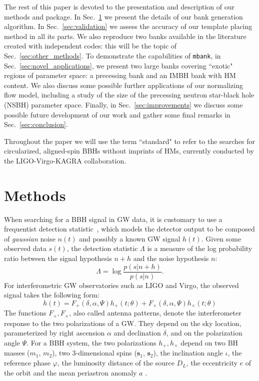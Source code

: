 \documentclass[twocolumn,showpacs,preprintnumbers,nofootinbib,prd,
superscriptaddress,10pt]{revtex4-2}
\begin{document}
The rest of this paper is devoted to the presentation and description of our methods and package.
In Sec.~\ref{sec:methods} we present the details of our bank generation algorithm.
In Sec.~\ref{sec:validation} we assess the accuracy of our template placing method in all its parts.
We also reproduce two banks available in the literature \cite{Harry:2017weg, Sakon:2022ibh} created with independent codes: this will be the topic of Sec.~\ref{sec:other_methods}.
To demonstrate the capabilities of \texttt{mbank}, in Sec.~\ref{sec:novel_applications}, we present two large banks covering ``exotic" regions of parameter space: a precessing bank and an IMBH bank with HM content. We also discuss some possible further applications of our normalizing flow model, including a study of the size of the precessing neutron star-black hole (NSBH) parameter space.
Finally, in Sec.~\ref{sec:improvements} we discuss some possible future development of our work and gather some final remarks in Sec.~\ref{sec:conclusion}.

Throughout the paper we will use the term ``standard" to refer to the searches for circularized, aligned-spin BBHs without imprints of HMs, currently conducted by the LIGO-Virgo-KAGRA collaboration.

\section{Methods} \label{sec:methods}

When searching for a BBH signal in GW data, it is customary to use a frequentist detection statistic~\cite{Creighton_book, Maggiore:2007ulw, Harry:2016ijz, Harry:2017weg}, which models the detector output to be composed of {\it gaussian} noise $n(t)$ and possibly a known GW signal $h(t)$.
Given some observed data $s(t)$, the detection statistic $\Lambda$ is a measure of the log probability ratio between the signal hypothesis $n+h$ and the noise hypothesis $n$:
\begin{equation}\label{eq:LL}
	\Lambda = \log\frac{p(s|n+h)}{p(s| n)}.
\end{equation}
For interferometric GW observatories such as LIGO and Virgo, the observed signal takes the following form:
\begin{equation}\label{eq:signal_model}
	h(t) = F_+(\delta, \alpha, \Psi) h_+(t;\theta) + F_\times(\delta, \alpha, \Psi) h_\times(t;\theta)
\end{equation}
The functions $F_+, F_\times$, also called antenna patterns, denote the interferometer response to the two polarizations of a GW. They depend on the sky location, parameterized by right ascension $\alpha$ and declination $\delta$, and on the polarization angle $\Psi$. 
For a BBH system, the two polarizations $h_+, h_\times$ depend on two BH masses ($m_1$, $m_2$), two 3-dimensional spins ($\mathbf{s}_1$, $\mathbf{s}_2$), the inclination angle $\iota$, the reference phase $\varphi$, the luminosity distance of the source $D_L$, the eccentricity $e$ of the orbit and the mean periastron anomaly $a$ \cite{Sathyaprakash_2009}.
\end{document}
